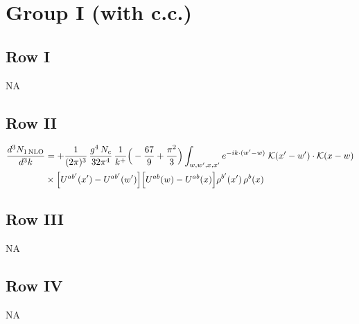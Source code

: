\documentclass[9pt]{article}
\numberwithin{equation}{section}
\begin{document}
\section{Group I (with c.c.)}
\subsection{Row I}
\textsc{NA}
\subsection{Row II}
\begin{align}
\frac{d^{3}N_{1\,\rm NLO}}{d^{3}k} & = +\frac{1}{(2\pi)^{3}}\,\frac{g^{4}\,N_{c}}{32\pi^{4}}\,\frac{1}{k^{+}}\Big(-\frac{67}{9}+\frac{\pi^{2}}{3}\Big)\int_{w,w',x,x'} e^{-ik\cdot(w'-w)}\;\mathcal{K}(x'-w')\cdot\mathcal{K}(x-w)\notag \\
& \times\Big[U^{ab'}(x')-U^{ab'}(w')\Big]\Big[U^{ab}(w)-U^{ab}(x)\Big]\rho^{b'}(x')\,\rho^{b}(x)
\end{align}
\subsection{Row III}
\textsc{NA}
\subsection{Row IV}
\textsc{NA}
\end{document}
